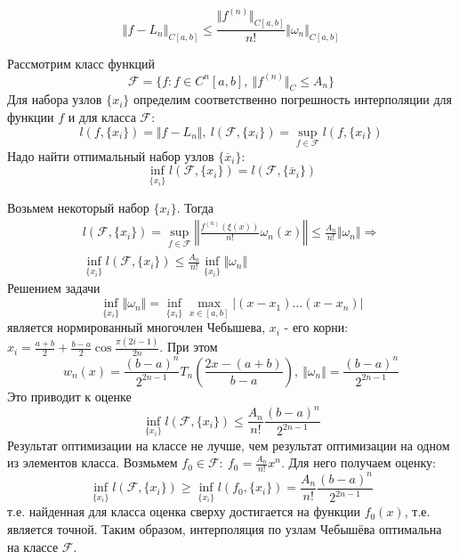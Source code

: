 \begin{corollary}
  $$\left\Vert f-L_n\right\Vert_{C[a,b]}\leq\frac{\Vert f^{(n)}\Vert_{C[a,b]}}{n!}\Vert\omega_n\Vert_{C[a,b]} $$
\end{corollary}
\begin{task}
  Рассмотрим класс функций $$\mathcal{F}=\{f:f\in C^n[a,b],\ \Vert f^{(n)}\Vert_C\leq A_n\}$$
  Для набора узлов $\{x_i\}$ определим соответственно погрешность интерполяции для функции $f$ и для класса $\mathcal{F}$:
  $$l(f, \{x_i\})=\Vert f-L_n\Vert,\ l(\mathcal{F}, \{x_i\})=\sup_{f\in\mathcal{F}}l(f,\{x_i\})$$
  Надо найти отпимальный набор узлов $\{\overline{x}_i\}$:
  $$\inf_{\{x_i\}}l(\mathcal{F}, \{x_i\})=l(\mathcal{F}, \{\overline{x}_i\})$$
\end{task}
Возьмем некоторый набор $\{x_i\}$. Тогда
\begin{align*}
  l(\mathcal{F}, \{x_i\})=\sup_{f\in\mathcal{F}}\left\Vert\frac{f^{(n)}(\xi(x))}{n!}\omega_n(x)\right\Vert\leq\frac{A_n}{n!}\Vert\omega_n\Vert\Rightarrow \\
  \inf_{\{x_i\}}l(\mathcal{F}, \{x_i\})\leq\frac{A_n}{n!}\inf_{\{x_i\}}\Vert\omega_n\Vert
\end{align*}
Решением задачи
$$\inf_{\{x_i\}}\Vert\omega_n\Vert=\inf_{\{x_i\}}\max_{x\in[a,b]}|(x-x_1)\ldots(x-x_n)|$$
является нормированный многочлен Чебышева, $x_i$ - его корни: $x_i=\frac{a+b}{2}+\frac{b-a}{2}\cos\frac{\pi(2i-1)}{2n}$. При этом
$$w_n(x)=\frac{(b-a)^n}{2^{2n-1}}T_n\left(\frac{2x-(a+b)}{b-a}\right),\ \Vert \omega_n\Vert=\frac{(b-a)^n}{2^{2n-1}}$$
Это приводит к оценке
$$\inf_{\{x_i\}}l(\mathcal{F}, \{x_i\})\leq\frac{A_n}{n!}\frac{(b-a)^n}{2^{2n-1}}$$
Результат оптимизации на классе не лучше, чем результат оптимизации на одном из элементов класса.
Возмьмем $f_0\in\mathcal{F}:\ f_0=\frac{A_n}{n!}x^n$. Для него получаем оценку:
$$\inf_{\{x_i\}}l(\mathcal{F}, \{x_i\})\geq\inf_{\{x_i\}}l(f_0, \{x_i\})=\frac{A_n}{n!}\frac{(b-a)^n}{2^{2n-1}}$$
т.е. найденная для класса оценка сверху достигается на функции $f_0(x)$, т.е. является точной.
Таким образом, интерполяция по узлам Чебышёва оптимальна на классе $\mathcal{F}$.
